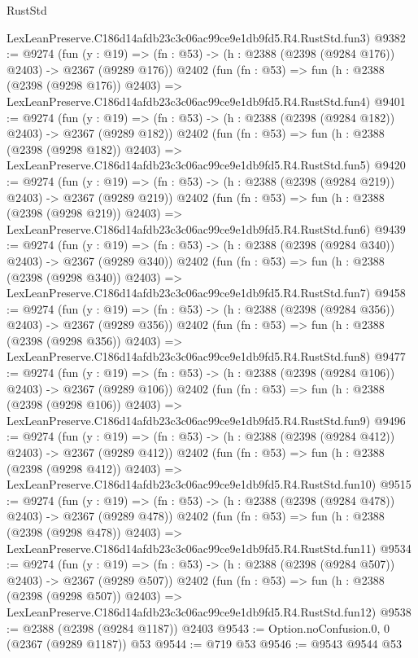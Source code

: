 \begin{lexlean}{RustStd}
\begin{coremodule}
    LexLeanPreserve.C186d14afdb23c3c06ac99ce9e1db9fd5.R4.RustStd.fun3)
@9382 := @9274
    (fun (y : @19) => (fn : @53) -> (h : @2388 (@2398 (@9284 @176)) @2403) -> @2367 (@9289 @176))
    @2402
    (fun (fn : @53) =>
    fun (h : @2388 (@2398 (@9298 @176)) @2403) =>
    LexLeanPreserve.C186d14afdb23c3c06ac99ce9e1db9fd5.R4.RustStd.fun4)
@9401 := @9274
    (fun (y : @19) => (fn : @53) -> (h : @2388 (@2398 (@9284 @182)) @2403) -> @2367 (@9289 @182))
    @2402
    (fun (fn : @53) =>
    fun (h : @2388 (@2398 (@9298 @182)) @2403) =>
    LexLeanPreserve.C186d14afdb23c3c06ac99ce9e1db9fd5.R4.RustStd.fun5)
@9420 := @9274
    (fun (y : @19) => (fn : @53) -> (h : @2388 (@2398 (@9284 @219)) @2403) -> @2367 (@9289 @219))
    @2402
    (fun (fn : @53) =>
    fun (h : @2388 (@2398 (@9298 @219)) @2403) =>
    LexLeanPreserve.C186d14afdb23c3c06ac99ce9e1db9fd5.R4.RustStd.fun6)
@9439 := @9274
    (fun (y : @19) => (fn : @53) -> (h : @2388 (@2398 (@9284 @340)) @2403) -> @2367 (@9289 @340))
    @2402
    (fun (fn : @53) =>
    fun (h : @2388 (@2398 (@9298 @340)) @2403) =>
    LexLeanPreserve.C186d14afdb23c3c06ac99ce9e1db9fd5.R4.RustStd.fun7)
@9458 := @9274
    (fun (y : @19) => (fn : @53) -> (h : @2388 (@2398 (@9284 @356)) @2403) -> @2367 (@9289 @356))
    @2402
    (fun (fn : @53) =>
    fun (h : @2388 (@2398 (@9298 @356)) @2403) =>
    LexLeanPreserve.C186d14afdb23c3c06ac99ce9e1db9fd5.R4.RustStd.fun8)
@9477 := @9274
    (fun (y : @19) => (fn : @53) -> (h : @2388 (@2398 (@9284 @106)) @2403) -> @2367 (@9289 @106))
    @2402
    (fun (fn : @53) =>
    fun (h : @2388 (@2398 (@9298 @106)) @2403) =>
    LexLeanPreserve.C186d14afdb23c3c06ac99ce9e1db9fd5.R4.RustStd.fun9)
@9496 := @9274
    (fun (y : @19) => (fn : @53) -> (h : @2388 (@2398 (@9284 @412)) @2403) -> @2367 (@9289 @412))
    @2402
    (fun (fn : @53) =>
    fun (h : @2388 (@2398 (@9298 @412)) @2403) =>
    LexLeanPreserve.C186d14afdb23c3c06ac99ce9e1db9fd5.R4.RustStd.fun10)
@9515 := @9274
    (fun (y : @19) => (fn : @53) -> (h : @2388 (@2398 (@9284 @478)) @2403) -> @2367 (@9289 @478))
    @2402
    (fun (fn : @53) =>
    fun (h : @2388 (@2398 (@9298 @478)) @2403) =>
    LexLeanPreserve.C186d14afdb23c3c06ac99ce9e1db9fd5.R4.RustStd.fun11)
@9534 := @9274
    (fun (y : @19) => (fn : @53) -> (h : @2388 (@2398 (@9284 @507)) @2403) -> @2367 (@9289 @507))
    @2402
    (fun (fn : @53) =>
    fun (h : @2388 (@2398 (@9298 @507)) @2403) =>
    LexLeanPreserve.C186d14afdb23c3c06ac99ce9e1db9fd5.R4.RustStd.fun12)
@9538 := @2388 (@2398 (@9284 @1187)) @2403
@9543 := Option.noConfusion.{0, 0} (@2367 (@9289 @1187)) @53
@9544 := @719 @53
@9546 := @9543 @9544 @53

\end{coremodule}
\end{lexlean}
